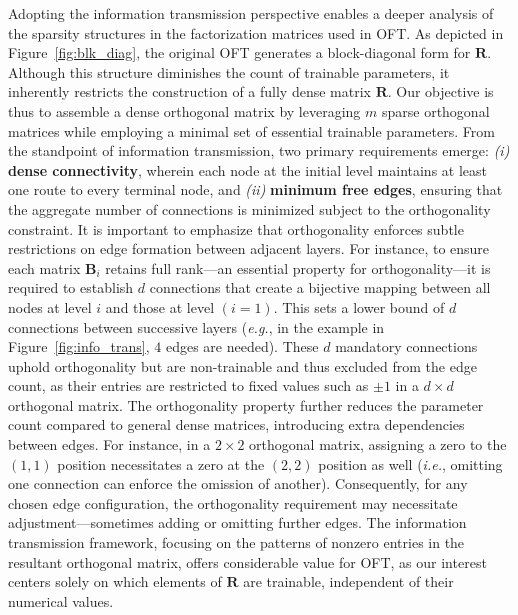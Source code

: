 Adopting the information transmission perspective enables a deeper analysis of the sparsity structures in the factorization matrices used in OFT. As depicted in Figure~\ref{fig:blk_diag}, the original OFT generates a block-diagonal form for $\bm{R}$. Although this structure diminishes the count of trainable parameters, it inherently restricts the construction of a fully dense matrix $\bm{R}$. Our objective is thus to assemble a dense orthogonal matrix by leveraging $m$ sparse orthogonal matrices while employing a minimal set of essential trainable parameters. From the standpoint of information transmission, two primary requirements emerge: \emph{(i)} \textbf{dense connectivity}, wherein each node at the initial level maintains at least one route to every terminal node, and \emph{(ii)} \textbf{minimum free edges}, ensuring that the aggregate number of connections is minimized subject to the orthogonality constraint. It is important to emphasize that orthogonality enforces subtle restrictions on edge formation between adjacent layers. For instance, to ensure each matrix $\bm{B}_i$ retains full rank—an essential property for orthogonality—it is required to establish $d$ connections that create a bijective mapping between all nodes at level $i$ and those at level $(i=1)$. This sets a lower bound of $d$ connections between successive layers (\emph{e.g.}, in the example in Figure~\ref{fig:info_trans}, $4$ edges are needed). These $d$ mandatory connections uphold orthogonality but are non-trainable and thus excluded from the edge count, as their entries are restricted to fixed values such as $\pm 1$ in a $d\times d$ orthogonal matrix. The orthogonality property further reduces the parameter count compared to general dense matrices, introducing extra dependencies between edges. For instance, in a $2\times2$ orthogonal matrix, assigning a zero to the $(1,1)$ position necessitates a zero at the $(2,2)$ position as well (\emph{i.e.}, omitting one connection can enforce the omission of another). Consequently, for any chosen edge configuration, the orthogonality requirement may necessitate adjustment—sometimes adding or omitting further edges. The information transmission framework, focusing on the patterns of nonzero entries in the resultant orthogonal matrix, offers considerable value for OFT, as our interest centers solely on which elements of $\bm{R}$ are trainable, independent of their numerical values.

